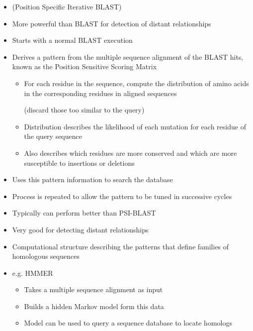 \documentclass[a4paper]{article}
\begin{document}

\begin{itemize}
  \item
    (Position Specific Iterative BLAST)

  \item
    More powerful than BLAST for detection of distant relationships

  \item
    Starts with a normal BLAST execution

  \item
    Derives a pattern from the multiple sequence alignment of the BLAST hits,
    known as the Position Sensitive Scoring Matrix

    \begin{itemize}
      \item
        For each residue in the sequence, compute the distribution of amino
        acids in the corresponding residues in aligned sequences

        (discard those too similar to the query)

      \item
        Distribution describes the likelihood of each mutation for each residue
        of the query sequence

      \item
        Also describes which residues are more conserved and which are more
        susceptible to insertions or deletions
    \end{itemize}

  \item
    Uses this pattern information to search the database

  \item
    Process is repeated to allow the pattern to be tuned in successive cycles
\end{itemize}


\begin{itemize}
  \item
    Typically can perform better than PSI-BLAST

  \item
    Very good for detecting distant relationships

  \item
    Computational structure describing the patterns that define families of
    homologous sequences

  \item
    e.g. HMMER

    \begin{itemize}
      \item
        Takes a multiple sequence alignment as input

      \item
        Builds a hidden Markov model form this data

      \item
        Model can be used to query a sequence database to locate homologs
    \end{itemize}
\end{itemize}
\end{document}
